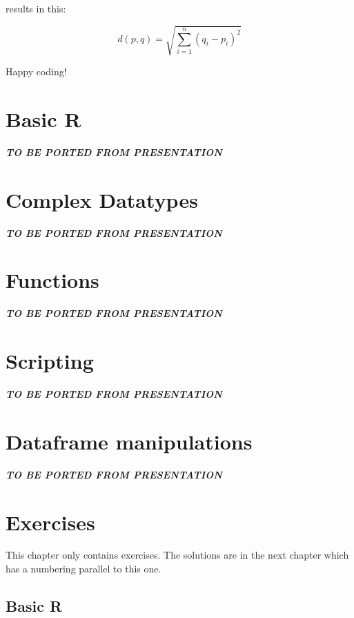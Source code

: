 \documentclass[]{book}
\begin{document}
results in this:

\[d(p, q) = \sqrt{\sum_{i = 1}^{n}(q_i-p_i)^2}\]

Happy coding!

\hypertarget{basic-r}{%
\chapter{Basic R}\label{basic-r}}

\textbf{\emph{TO BE PORTED FROM PRESENTATION}}

\hypertarget{complex-datatypes}{%
\chapter{Complex Datatypes}\label{complex-datatypes}}

\textbf{\emph{TO BE PORTED FROM PRESENTATION}}

\hypertarget{functions}{%
\chapter{Functions}\label{functions}}

\textbf{\emph{TO BE PORTED FROM PRESENTATION}}

\hypertarget{scripting}{%
\chapter{Scripting}\label{scripting}}

\textbf{\emph{TO BE PORTED FROM PRESENTATION}}

\hypertarget{dataframe-manipulations}{%
\chapter{Dataframe manipulations}\label{dataframe-manipulations}}

\textbf{\emph{TO BE PORTED FROM PRESENTATION}}

\hypertarget{exercises}{%
\chapter{Exercises}\label{exercises}}

This chapter only contains exercises. The solutions are in the next chapter which has a numbering parallel to this one.

\hypertarget{basic-r-1}{%
\section{Basic R}\label{basic-r-1}}
\end{document}
